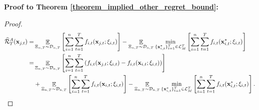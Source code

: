 \documentclass{article}
\begin{document}
\textbf{Proof to Theorem \ref{theorem_implied_other_regret_bound}:}
\begin{proof}

\begin{align}
\nonumber
\widehat{{\mathcal{R}}}_T^{A}({\bf x}_{j,t}) = & \mathop{\mathbb{E}}_{\Xi_{n,T} \sim \mathcal{D}_{n,T}}\left [\sum_{i=1}^n \sum_{t=1}^T f_{i,t}({\bf x}_{j,t};\xi_{i,t})\right ]  - \mathop{\mathbb{E}}_{\Xi_{n,T} \sim \mathcal{D}_{n,T}}\min_{\{{\bf x}_{i,t}^\ast\}_{t=1}^T \in {\mathcal{L}}_M^T}\left [\sum_{i=1}^n \sum_{t=1}^T f_{i,t}({\bf x}_{i,t}^\ast;\xi_{i,t})\right ] \\ \nonumber
= & \mathop{\mathbb{E}}_{\Xi_{n,T} \sim \mathcal{D}_{n,T}}\left [\sum_{i=1}^n \sum_{t=1}^T \left( f_{i,t}({\bf x}_{j,t};\xi_{i,t}) - f_{i,t}({\bf x}_{i,t};\xi_{i,t}) \right)\right ]  \\ \label{equa_implied_other_regret_temp0}
& + \mathop{\mathbb{E}}_{\Xi_{n,T} \sim \mathcal{D}_{n,T}}\left [\sum_{i=1}^n \sum_{t=1}^T f_{i,t}({\bf x}_{i,t};\xi_{i,t})\right ] - \mathop{\mathbb{E}}_{\Xi_{n,T} \sim \mathcal{D}_{n,T}}\min_{\{{\bf x}_{i,t}^\ast\}_{t=1}^T \in {\mathcal{L}}_M^T}\left [\sum_{i=1}^n \sum_{t=1}^T f_{i,t}({\bf x}_{i,t}^\ast;\xi_{i,t})\right ].
\end{align}


\end{proof}
\end{document}
